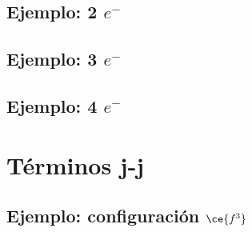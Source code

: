 \documentclass[12pt]{article}
\begin{document}
\maketitle
\tableofcontents
\resetnumpagetitle
\pagestyle{academic} 
 
 
\subsection{Ejemplo: 2 \texorpdfstring{$e^{-}$}{e^-}} 
 

\subsection{Ejemplo: 3 \texorpdfstring{$e^{-}$}{e^-}} 
 
\subsection{Ejemplo: 4 \texorpdfstring{$e^{-}$}{e^-}}
 
\section{Términos j-j}\label{sec: terminos j-j} 
 
\subsection{Ejemplo: configuración \texorpdfstring{$\ce{f^{3}}$}{f^3}}

\end{document}

